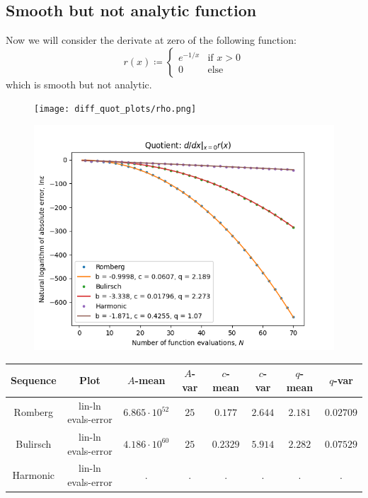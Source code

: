\subsection{Smooth but not analytic function}

Now we will consider the derivate at zero of the following function:
\[
r(x) \coloneqq \begin{cases}
e^{-1/x} & \text{if } x > 0\\
0 & \text{else}
\end{cases}
\]
which is smooth but not analytic.

\begin{figure}[H]
\centering
\begin{minipage}{0.45\textwidth}
\centering
\texttt{[image: diff\_quot\_plots/rho.png]}
\end{minipage}
\begin{minipage}{0.45\textwidth}
\centering
\includegraphics[scale=0.45]{diff_quot_plots/rho_hp_trend.png}
\end{minipage}
\end{figure}

\begin{table}[H]
    \centering
    \small
    \begin{tabular}{c|c||c|c|c|c|c|c}
Sequence & Plot & \(A\)-mean & \(A\)-var & \(c\)-mean & \(c\)-var & \(q\)-mean & \(q\)-var\\\hline
Romberg & lin-ln evals-error & \(6.865\cdot 10^{52}\) & \(25\) & \(0.177\) & \(2.644\) & \(2.181\) & \(0.02709\) \\
Bulirsch & lin-ln evals-error & \(4.186\cdot 10^{60}\) & \(25\) & \(0.2329\) & \(5.914\) & \(2.282\) & \(0.07529\) \\
Harmonic & lin-ln evals-error & . & . & . & . & . & . \\
    \end{tabular}
    \label{tab:my_label}
\end{table}

